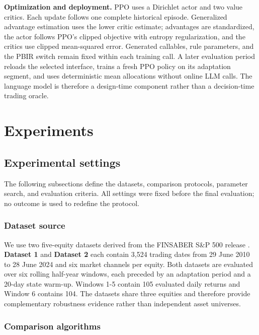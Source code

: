 \documentclass[pdflatex,sn-basic,Numbered]{sn-jnl}
\begin{document}
\textbf{Optimization and deployment.} PPO uses a Dirichlet actor and two value critics. Each update follows one complete historical episode. Generalized advantage estimation \cite{ref31} uses the lower critic estimate; advantages are standardized, the actor follows PPO's clipped objective \cite{ref8} with entropy regularization, and the critics use clipped mean-squared error. Generated callables, rule parameters, and the PBIR switch remain fixed within each training call. A later evaluation period reloads the selected interface, trains a fresh PPO policy on its adaptation segment, and uses deterministic mean allocations without online LLM calls. The language model is therefore a design-time component rather than a decision-time trading oracle.

\hypertarget{experiments}{%
\section{Experiments}\label{experiments}}

\hypertarget{experimental-settings}{%
\subsection{Experimental settings}\label{experimental-settings}}

The following subsections define the datasets, comparison protocols, parameter search, and evaluation criteria. All settings were fixed before the final evaluation; no outcome is used to redefine the protocol.

\hypertarget{dataset-source}{%
\subsubsection{Dataset source}\label{dataset-source}}

We use two five-equity datasets derived from the FINSABER S\&P 500 release \cite{ref29}. \textbf{Dataset 1} and \textbf{Dataset 2} each contain 3,524 trading dates from 29 June 2010 to 28 June 2024 and six market channels per equity. Both datasets are evaluated over six rolling half-year windows, each preceded by an adaptation period and a 20-day state warm-up. Windows 1-5 contain 105 evaluated daily returns and Window 6 contains 104. The datasets share three equities and therefore provide complementary robustness evidence rather than independent asset universes.

\hypertarget{comparison-algorithms}{%
\subsubsection{Comparison algorithms}\label{comparison-algorithms}}
\end{document}
